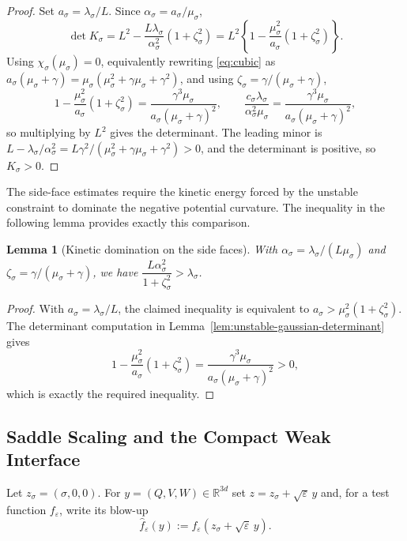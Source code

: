 \documentclass[11pt]{article}
\numberwithin{equation}{section}
\theoremstyle{plain}
\newtheorem{lemma}[theorem]{Lemma}
\theoremstyle{definition}
\theoremstyle{remark}
\newcommand{\R}{\mathbb R}
\newcommand{\eps}{\varepsilon}
\begin{document}
\begin{proof}
Set $a_\sigma=\lambda_\sigma/L$. 
Since $\alpha_\sigma=a_\sigma/\mu_\sigma$,
\[
\det K_\sigma
=L^2-\frac{L\lambda_\sigma}{\alpha_\sigma^2}\left(1+\zeta_\sigma^2\right)
=L^2\left\{1-\frac{\mu_\sigma^2}{a_\sigma}\left(1+\zeta_\sigma^2\right)\right\}.
\]
Using $\chi_\sigma(\mu_\sigma)=0$, equivalently rewriting
\eqref{eq:cubic} as
$a_\sigma(\mu_\sigma+\gamma)
=\mu_\sigma(\mu_\sigma^2+\gamma\mu_\sigma+\gamma^2)$,
and using $\zeta_\sigma=\gamma/(\mu_\sigma+\gamma)$,
\[
1-\frac{\mu_\sigma^2}{a_\sigma}(1+\zeta_\sigma^2)
=\frac{\gamma^3\mu_\sigma}
{a_\sigma(\mu_\sigma+\gamma)^2},
\qquad
\frac{c_\sigma\lambda_\sigma}{\alpha_\sigma^2\mu_\sigma}
=\frac{\gamma^3\mu_\sigma}
{a_\sigma(\mu_\sigma+\gamma)^2},
\]
so multiplying by $L^2$ gives the determinant.  The leading minor is
$L-\lambda_\sigma/\alpha_\sigma^2
=L\gamma^2/(\mu_\sigma^2+\gamma\mu_\sigma+\gamma^2)>0$, and the
determinant is positive, so $K_\sigma>0$.
\end{proof}


The side-face estimates require the kinetic energy forced by
the unstable constraint to dominate the negative potential curvature.  The
inequality in the following lemma provides exactly this comparison.

\begin{lemma}[Kinetic domination on the side faces]
\label{lem:side-face-kinetic-domination}
With $\alpha_\sigma=\lambda_\sigma/(L\mu_\sigma)$ and
$\zeta_\sigma=\gamma/(\mu_\sigma+\gamma)$,
we have $\dfrac{L\alpha_\sigma^2}{1+\zeta_\sigma^2}>\lambda_\sigma$.
\end{lemma}

\begin{proof}
With $a_\sigma=\lambda_\sigma/L$, the claimed inequality is equivalent to
$a_\sigma>\mu_\sigma^2(1+\zeta_\sigma^2)$.  The determinant computation in
Lemma~\ref{lem:unstable-gaussian-determinant} gives
\[
1-\frac{\mu_\sigma^2}{a_\sigma}(1+\zeta_\sigma^2)
=\frac{\gamma^3\mu_\sigma}
{a_\sigma(\mu_\sigma+\gamma)^2}>0,
\]
which is exactly the required inequality.
\end{proof}

\subsection{Saddle Scaling and the Compact Weak Interface}
\label{app:regularization}

Let $z_\sigma=(\sigma,0,0)$.  For $y=(Q,V,W)\in\R^{3d}$ set
$z=z_\sigma+\sqrt\eps\,y$ and, for a test function $f_\eps$, write its blow-up
\[
\widehat f_\eps(y):=f_\eps(z_\sigma+\sqrt\eps\,y).
\]
\end{document}
